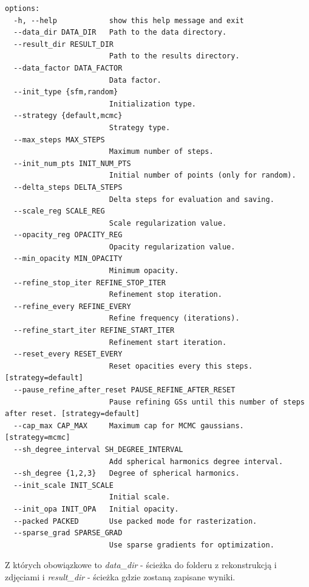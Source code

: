\lstset{style=basicstyle}
\begin{lstlisting}[language=SHELXL] 
  options:
  -h, --help            show this help message and exit
  --data_dir DATA_DIR   Path to the data directory.
  --result_dir RESULT_DIR
                        Path to the results directory.
  --data_factor DATA_FACTOR
                        Data factor.
  --init_type {sfm,random}
                        Initialization type.
  --strategy {default,mcmc}
                        Strategy type.
  --max_steps MAX_STEPS
                        Maximum number of steps.
  --init_num_pts INIT_NUM_PTS
                        Initial number of points (only for random).
  --delta_steps DELTA_STEPS
                        Delta steps for evaluation and saving.
  --scale_reg SCALE_REG
                        Scale regularization value.
  --opacity_reg OPACITY_REG
                        Opacity regularization value.
  --min_opacity MIN_OPACITY
                        Minimum opacity.
  --refine_stop_iter REFINE_STOP_ITER
                        Refinement stop iteration.
  --refine_every REFINE_EVERY
                        Refine frequency (iterations).
  --refine_start_iter REFINE_START_ITER
                        Refinement start iteration.
  --reset_every RESET_EVERY
                        Reset opacities every this steps. [strategy=default]
  --pause_refine_after_reset PAUSE_REFINE_AFTER_RESET
                        Pause refining GSs until this number of steps after reset. [strategy=default]
  --cap_max CAP_MAX     Maximum cap for MCMC gaussians. [strategy=mcmc]
  --sh_degree_interval SH_DEGREE_INTERVAL
                        Add spherical harmonics degree interval.
  --sh_degree {1,2,3}   Degree of spherical harmonics.
  --init_scale INIT_SCALE
                        Initial scale.
  --init_opa INIT_OPA   Initial opacity.
  --packed PACKED       Use packed mode for rasterization.
  --sparse_grad SPARSE_GRAD
                        Use sparse gradients for optimization.
\end{lstlisting}

\lstset{style=pythonstyle}

Z których obowiązkowe to \textit{data\_dir} - ścieżka do folderu z rekonstrukcją i zdjęciami i \textit{result\_dir} - ścieżka gdzie zostaną zapisane wyniki. 


